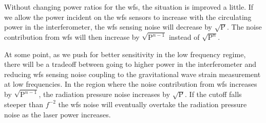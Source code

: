 Without changing power ratios for the \ac{wfs}, the situation is improved a
little.
If we allow the power incident on the \ac{wfs} sensors to increase with the
circulating power in the interferometer, the \ac{wfs} sensing noise will
decrease by $\sqrt{\mathrm{P}}$.
The noise contribution from \ac{wfs} will then increase by
$\sqrt{\mathrm{P}^{n-1}}$ instead of $\sqrt{\mathrm{P}^{n}}$.

At some point, as we push for better sensitivity in the low frequency regime,
there will be a tradeoff between going to higher power in the
interferometer and reducing \ac{wfs} sensing noise coupling to the gravitational
wave strain measurement at low frequencies.
In the region where the noise contribution from \ac{wfs} increases by
$\sqrt{\mathrm{P}^{n-1}}$,
the radiation pressure noise increases by $\sqrt{\mathrm{P}}$.
If the cutoff falls steeper than $f^{-2}$ the \ac{wfs} noise will eventually overtake the radiation pressure noise as the laser power increases.


